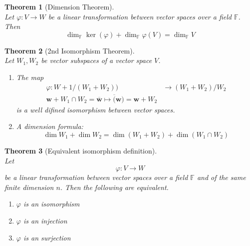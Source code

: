 \documentclass[12pt]{article}
\newtheorem{theorem}{Theorem}[section]
\theoremstyle{definition}
\begin{document}
\begin{theorem}[Dimension Theorem]
\hfill\\\normalfont Let $\varphi: V\to W$ be a linear transformation between vector spaces over a field $\mathbb{F}$. Then
\[
\dim_\mathbb{F}\ker(\varphi)+\dim_\mathbb{F}\varphi(V)=\dim_\mathbb{F}V
\]
\end{theorem}
\begin{theorem}[2nd Isomorphism Theorem]
\hfill\\\normalfont Let $W_1,W_2$ be vector subspaces of a vector space $V$.
\begin{enumerate}[label=(\arabic*)]
\item The map
\[
\begin{aligned}
\varphi:W+1/(W_1+W_2))&\to(W_1+W_2)/W_2\\
\mathbf{w}+W_1\cap W_2=\overline{\mathbf{w}}\mapsto\overline(\mathbf{w})=\mathbf{w}+W_2
\end{aligned}
\]
is a well difined isomorphism between vector spaces.
\item A dimension formula:
\[
\dim W_1 + \dim W_2 = \dim(W_1+W_2)+\dim(W_1\cap W_2)
\]
\end{enumerate}
\end{theorem}
\begin{theorem}[Equivalent isomorphism definition]
\hfill\\\normalfont Let
\[
\varphi:V\to W
\]
be a linear transformation between vector spaces over a field $\mathbb{F}$ and of the same finite dimension $n$. Then the following are equivalent.
\begin{enumerate}[label=(\arabic*)]
\item $\varphi$ is an isomorphism
\item $\varphi$ is an injection
\item $\varphi$ is an surjection
\end{enumerate}
\end{theorem}
\clearpage
\end{document}
